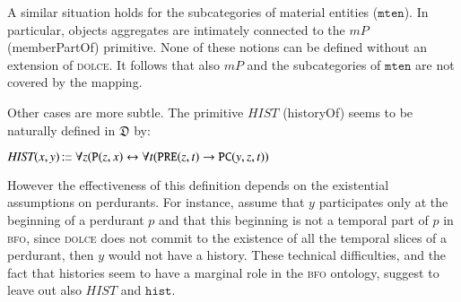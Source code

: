 \documentclass[ao]{iosart2x}
\newcommand{\nb}[1]{\textcolor{red}{$|$}\marginpar{\hspace*{-0cm}\parbox{20mm}{\scriptsize\raggedright\textcolor{red}{#1}}}}
\newcommand{\bflist}{\begin{list}{}{\setlength{\topsep}{2mm}\setlength{\parsep}{0mm}\setlength{\leftmargin}{9.2mm}\setlength{\labelwidth}{8mm}}}
\newcommand{\eflist}{\end{list}}
\newcommand{\pr}[1]{\mathtt{#1}}
\newcommand{\prbfo}[1]{{\textit{{#1}}}}
\newcommand{\cn}[1]{\mathtt{#1}}
\newcommand{\ifif}{\leftrightarrow}
\newcommand\textequal{%
 \rule[.08ex]{5pt}{0.35pt}\llap{\rule[.78ex]{5pt}{0.35pt}}}
\newcommand{\sdef}{{\hspace{1.5pt}:\hspace{-2.5pt}\textequal\hspace{3pt}}}
\newcommand{\dolce}{{\textsc{dolce}}}
\newcommand{\bfo}{{\textsc{bfo}}}
\newcommand {\thdolce} {\ensuremath{\mathfrak{D}}}
\newcommand {\Pd} {\ensuremath{\pr{P}}}
\newcommand {\PREd} {\ensuremath{\pr{PRE}}}
\newcommand {\PCd} {\ensuremath{\pr{PC}}}
\newcommand{\mtenbcat}{\cn{mten}}
\newcommand{\histbcat}{\cn{hist}}
\newcommand{\bfompart}{\prbfo{mP}}
\newcommand{\bfohistory}{\prbfo{HIST}}
\begin{document}
A similar situation holds for the subcategories of material entities ($\mtenbcat$). In particular, objects aggregates are intimately connected to the $\bfompart$ (memberPartOf) primitive. None of these notions can be defined without an extension of {\dolce}. It follows that also $\bfompart$ and the subcategories of $\mtenbcat$ are not covered by the mapping.

Other cases are more subtle. The primitive $\bfohistory$ (historyOf) seems to be naturally defined in $\thdolce$ by:
%
\bflist
\item[] $\bfohistory(x,y) \sdef \forall z(\Pd(z,x) \ifif \forall t(\PREd(z,t) \to \PCd(y,z,t))$
\eflist
%
However the effectiveness of this definition depends on the existential assumptions on perdurants. 
For instance, assume that $y$ participates only at the beginning of a perdurant $p$ and that this beginning is not a temporal part of $p$ in {\bfo}, since {\dolce} does not commit to the existence of all the temporal slices of a perdurant, then $y$ would not have a history. %
These technical difficulties, and the fact that histories seem to have a marginal role in the {\bfo} ontology, suggest to leave out also $\bfohistory$ and $\histbcat$.
\end{document}
